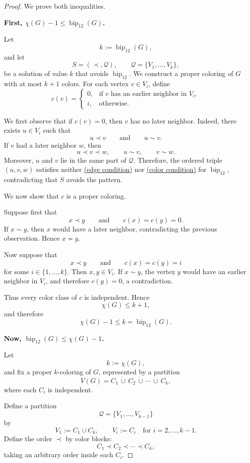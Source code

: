 \documentclass[12pt]{article}
\theoremstyle{plain}
\theoremstyle{definition}
\theoremstyle{remark}
\theoremstyle{definition}
\newcommand{\edgecondition}{%
  \hyperref[def:avoid:cond:edge]{(edge condition)}\xspace
}
\newcommand{\colorcondition}{%
  \hyperref[def:avoid:cond:color]{(color condition)}\xspace
}
\newcommand{\biplabel}{\mathrm{bip}}
\DeclareRobustCommand{\bipparam}[1]{%
  \ensuremath{\mathop{\biplabel}\nolimits_{#1}}%
}
\begin{document}
\begin{proof}
We prove both inequalities.

\medskip
\noindent\textbf{First, \(\chi(G)-1\le \bipparam{12}(G)\).}

Let
\[
k:=\bipparam{12}(G),
\]
and let
\[
S=(\prec,\mathcal Q),
\qquad
\mathcal Q=\{V_1,\dots,V_k\},
\]
be a solution of value \(k\) that avoids \(\operatorname{bip}_{12}\).
We construct a proper coloring of \(G\) with at most \(k+1\) colors. For each vertex \(v\in V_i\), define
\[
c(v)=
\begin{cases}
0,
& \text{if \(v\) has an earlier neighbor in \(V_i\)},\\[1mm]
i,
& \text{otherwise}.
\end{cases}
\]

We first observe that if \(c(v)=0\), then \(v\) has no later neighbor. Indeed, there exists
\(u\in V_i\) such that
\[
u\prec v
\qquad\text{and}\qquad
u\sim v.
\]
If \(v\) had a later neighbor \(w\), then
\[
u\prec v\prec w,
\qquad
u\sim v,
\qquad
v\sim w.
\]
Moreover, \(u\) and \(v\) lie in the same part of \(\mathcal Q\). Therefore, the ordered triple
\((u,v,w)\) satisfies neither \edgecondition{} nor \colorcondition{} for
\(\operatorname{bip}_{12}\), contradicting that \(S\) avoids the pattern.

We now show that \(c\) is a proper coloring.

Suppose first that
\[
x\prec y
\qquad\text{and}\qquad
c(x)=c(y)=0.
\]
If \(x\sim y\), then \(x\) would have a later neighbor, contradicting the previous observation. Hence
\(x\not\sim y\).

Now suppose that
\[
x\prec y
\qquad\text{and}\qquad
c(x)=c(y)=i
\]
for some \(i\in\{1,\dots,k\}\). Then \(x,y\in V_i\). If \(x\sim y\), the vertex \(y\) would have an earlier
neighbor in \(V_i\), and therefore \(c(y)=0\), a contradiction.

Thus every color class of \(c\) is independent. Hence
\[
\chi(G)\le k+1,
\]
and therefore
\[
\chi(G)-1\le k=\bipparam{12}(G).
\]

\medskip
\noindent\textbf{Now, \(\bipparam{12}(G)\le \chi(G)-1\).}

Let
\[
k:=\chi(G),
\]
and fix a proper \(k\)-coloring of \(G\), represented by a partition
\[
V(G)=C_1\,\dot\cup\,C_2\,\dot\cup\,\cdots\,\dot\cup\,C_k,
\]
where each \(C_i\) is independent.

Define a partition
\[
\mathcal Q=\{V_1,\dots,V_{k-1}\}
\]
by
\[
V_1:=C_1\cup C_k,
\qquad
V_i:=C_i
\quad\text{for }i=2,\dots,k-1.
\]
Define the order \(\prec\) by color blocks:
\[
C_1\prec C_2\prec\cdots\prec C_k,
\]
taking an arbitrary order inside each \(C_i\).




\end{proof}
\end{document}
